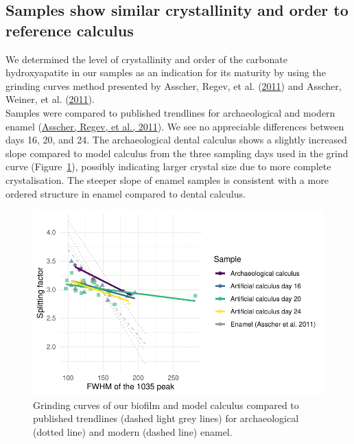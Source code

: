 \documentclass[
  b5paper,
]{book}
\begin{document}
\hypertarget{samples-show-similar-crystallinity-and-order-to-reference-calculus}{%
\subsection{Samples show similar crystallinity and order to reference
calculus}\label{samples-show-similar-crystallinity-and-order-to-reference-calculus}}

We determined the level of crystallinity and order of the carbonate
hydroxyapatite in our samples as an indication for its maturity by using
the grinding curves method presented by Asscher, Regev, et al.
(\protect\hyperlink{ref-asscherAtomicDisorder2011}{2011}) and Asscher,
Weiner, et al.
(\protect\hyperlink{ref-asscherVariationsAtomic2011}{2011}).\\
Samples were compared to published trendlines for archaeological and
modern enamel
(\protect\hyperlink{ref-asscherAtomicDisorder2011}{Asscher, Regev, et
al., 2011}). We see no appreciable differences between days 16, 20, and
24. The archaeological dental calculus shows a slightly increased slope
compared to model calculus from the three sampling days used in the
grind curve (Figure~\ref{fig-grind-curve}), possibly indicating larger
crystal size due to more complete crystalisation. The steeper slope of
enamel samples is consistent with a more ordered structure in enamel
compared to dental calculus.

\begin{figure}

{\centering \includegraphics{figures/byoc-valid-fig-grind-curve-1.pdf}

}

\caption{\label{fig-grind-curve}Grinding curves of our biofilm and model
calculus compared to published trendlines (dashed light grey lines) for
archaeological (dotted line) and modern (dashed line) enamel.}

\end{figure}
\end{document}
